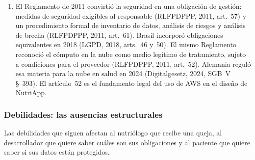 \documentclass[12pt, a4paper]{article}
\begin{document}
\begin{enumerate}[label=\Roman*.]
  \item El Reglamento de 2011 convirtió la seguridad en una obligación de
  gestión: medidas de seguridad exigibles al responsable (RLFPDPPP, 2011,
  art.~57) y un procedimiento formal de inventario de datos, análisis de
  riesgos y análisis de brecha (RLFPDPPP, 2011, art.~61). Brasil incorporó
  obligaciones equivalentes en 2018 (LGPD, 2018, arts.~46 y~50). El mismo
  Reglamento reconoció el cómputo en la nube como medio legítimo de
  tratamiento, sujeto a condiciones para el proveedor (RLFPDPPP,
  2011, art.~52). Alemania reguló esa materia para la nube en salud
  en 2024 (Digitalgesetz, 2024, SGB~V \S~393). El artículo~52 es el
  fundamento legal del uso de AWS en el diseño de
  NutriApp.
 
\end{enumerate}
 
 
\subsubsection{Debilidades: las ausencias estructurales}
 
Las debilidades que siguen afectan al nutriólogo que recibe una
queja, al desarrollador que quiere saber cuáles son sus
obligaciones y al paciente que quiere saber si sus datos están
protegidos.
 
\end{document}
